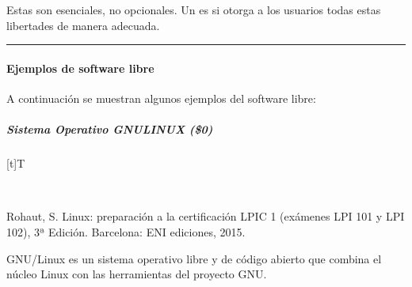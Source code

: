 \documentclass[letterpaper,10pt,spanish]{sphinxmanual}
\let\sphinxpxdimen\pdfpxdimen\else\newdimen\sphinxpxdimen
\begin{document}
\sphinxAtStartPar
Estas  son esenciales, no opcionales. Un  es  si otorga a los usuarios todas estas libertades de manera adecuada.


\bigskip\hrule\bigskip



\paragraph{Ejemplos de software libre}
\label{\detokenize{cursos/ofimatica10/recursos/T02:ejemplos-de-software-libre}}
\sphinxAtStartPar
A continuación se muestran algunos ejemplos del software libre:


\subparagraph{Sistema Operativo GNU\sphinxhyphen{}LINUX (\$0)}
\label{\detokenize{cursos/ofimatica10/recursos/T02:sistema-operativo-gnu-linux-0}}

\begin{savenotes}\sphinxattablestart
\sphinxthistablewithglobalstyle
\centering
\begin{tabulary}{\linewidth}[t]{T}
\sphinxtoprule
\sphinxtableatstartofbodyhook

\begin{sphinxfigure-in-table}
\centering
\capstart
\noindent\sphinxincludegraphics[width=300\sphinxpxdimen]{{image032}.png}
\label{\detokenize{cursos/ofimatica10/recursos/T02:id35}}\end{sphinxfigure-in-table}\relax
\\
\sphinxbottomrule
\end{tabulary}
\sphinxtableafterendhook\par
\sphinxattableend\end{savenotes}

\sphinxAtStartPar
%
\begin{footnote}[3]\sphinxAtStartFootnote
Rohaut, S. Linux: preparación a la certificación LPIC 1 (exámenes LPI 101 y LPI 102), 3ª Edición. Barcelona: ENI ediciones, 2015.
%
\end{footnote} GNU/Linux es un sistema operativo libre y de código abierto que combina el núcleo Linux con las herramientas del proyecto GNU.
\end{document}
